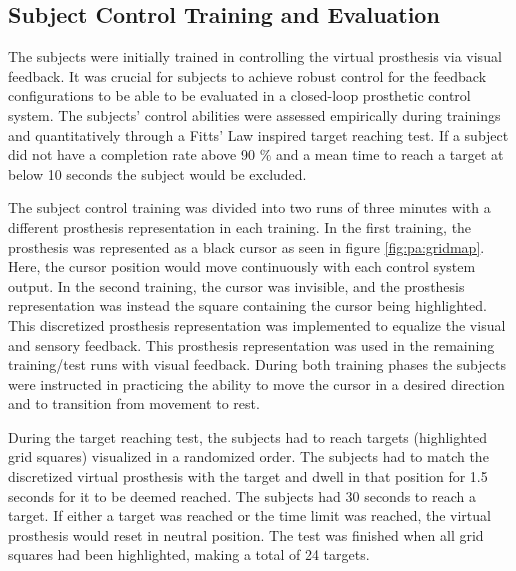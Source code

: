 \subsection{Subject Control Training and Evaluation} \label{sec:pa:subjectcontrol}
The subjects were initially trained in controlling the virtual prosthesis via visual feedback. It was crucial for subjects to achieve robust control for the feedback configurations to be able to be evaluated in a closed-loop prosthetic control system. The subjects' control abilities were assessed empirically during trainings and quantitatively through a Fitts' Law inspired target reaching test. If a subject did not have a completion rate above 90 $\%$ and a mean time to reach a target at below 10 seconds the subject would be excluded. 

The subject control training was divided into two runs of three minutes with a different prosthesis representation in each training. In the first training, the prosthesis was represented as a black cursor as seen in figure \ref{fig:pa:gridmap}. Here, the cursor position would move continuously with each control system output. In the second training, the cursor was invisible, and the prosthesis representation was instead the square containing the cursor being highlighted. This discretized prosthesis representation was implemented to equalize the visual and sensory feedback. This prosthesis representation was used in the remaining training/test runs with visual feedback. During both training phases the subjects were instructed in practicing the ability to move the cursor in a desired direction and to transition from movement to rest. 

During the target reaching test, the subjects had to reach targets (highlighted grid squares) visualized in a randomized order. The subjects had to match the discretized virtual prosthesis with the target and dwell in that position for 1.5 seconds for it to be deemed reached. The subjects had 30 seconds to reach a target. If either a target was reached or the time limit was reached, the virtual prosthesis would reset in neutral position. The test was finished when all grid squares had been highlighted, making a total of 24 targets. 